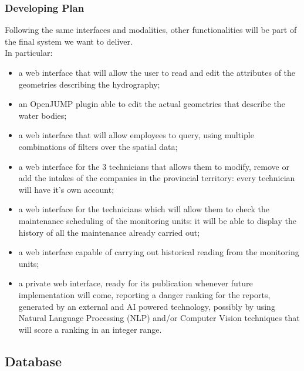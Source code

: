 \subsubsection{Developing Plan}
Following the same interfaces and modalities, other functionalities will be part of the final system we want to deliver.\\
In particular:
\begin{itemize}
    \item a web interface that will allow the user to read and edit the attributes of the geometries describing the hydrography;
    \item an OpenJUMP plugin able to edit the actual geometries that describe the water bodies;
    \item a web interface that will allow employees to query, using multiple combinations of filters over the spatial data;
    \item a web interface for the 3 technicians that allows them to modify, remove or add the intakes of the companies in the provincial territory: every technician will have it's own account;
    \item a web interface for the technicians which will allow them to check the maintenance scheduling of the monitoring units: it will be able to display the history of all the maintenance already carried out;
    \item a web interface capable of carrying out historical reading from the monitoring units;
    \item a private web interface, ready for its publication whenever future implementation will come, reporting a danger ranking for the reports, generated by an external and AI powered technology, possibly by using Natural Language Processing (NLP) and/or Computer Vision techniques that will score a ranking in an integer range.
\end{itemize}

\subsection{Database}
